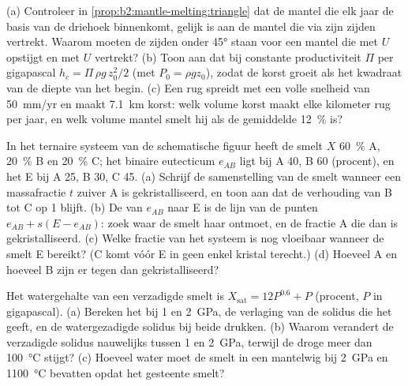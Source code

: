\begin{exercise}[$\star\star\star$]\label{exo:b2:mantle-melting:10}
(a) Controleer in \cref{prop:b2:mantle-melting:triangle} dat de mantel die elk jaar de
basis van de driehoek binnenkomt, gelijk is aan de mantel die via zijn zijden vertrekt. Waarom
moeten de zijden onder \ang{45} staan voor een mantel die met $U$ opstijgt en met $U$ vertrekt?
(b) Toon aan dat bij constante productiviteit $\Pi$ per gigapascal $h_c = \Pi\,\rho
g\,z_0^2/2$ (met $P_0 = \rho g z_0$), zodat de korst groeit als het kwadraat van de
diepte van het begin. (c) Een rug spreidt met een volle snelheid van \qty{50}{mm/yr} en
maakt \qty{7.1}{km} korst: welk volume korst maakt elke kilometer rug
per jaar, en welk volume mantel smelt hij als de gemiddelde 
\qty{12}{\percent} is?
\end{exercise}

\begin{exercise}[$\star\star\star$]\label{exo:b2:mantle-melting:11}
In het ternaire systeem van de schematische figuur heeft de smelt $X$
\qty{60}{\percent} A, \qty{20}{\percent} B en \qty{20}{\percent} C; het
binaire eutecticum $e_{AB}$ ligt bij A 40, B 60 (procent), en het  E bij
A 25, B 30, C 45. (a) Schrijf de samenstelling van de smelt wanneer een massafractie $t$
zuiver A is gekristalliseerd, en toon aan dat de verhouding van B tot C op 1 blijft. (b) De
 van $e_{AB}$ naar E is de lijn van de punten $e_{AB} + s(E - e_{AB})$: zoek
waar de smelt haar ontmoet, en de fractie A die dan is gekristalliseerd. (c) Welke fractie van het systeem
is nog vloeibaar wanneer de smelt E bereikt? (C komt vóór E in geen enkel
kristal terecht.) (d) Hoeveel A en hoeveel B zijn er tegen dan gekristalliseerd?
\end{exercise}

\begin{exercise}[$\star\star\star$]\label{exo:b2:mantle-melting:12}
Het watergehalte van een verzadigde smelt is $X_{\mathrm{sat}} = 12P^{0.6} + P$
(procent, $P$ in gigapascal). (a) Bereken het bij 1 en \qty{2}{GPa}, de verlaging van de solidus
die het geeft, en de watergezadigde solidus bij beide drukken. (b) Waarom verandert
de verzadigde solidus nauwelijks tussen 1 en \qty{2}{GPa}, terwijl de droge
meer dan \qty{100}{\celsius} stijgt? (c) Hoeveel water moet de smelt in een mantelwig bij \qty{2}{GPa} en
\qty{1100}{\celsius} bevatten opdat het gesteente smelt?
\end{exercise}

